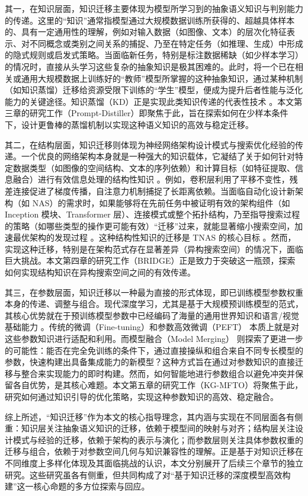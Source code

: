 \documentclass[../main.tex]{subfiles}
\begin{document}
其一，在知识层面，知识迁移主要体现为模型所学习到的抽象语义知识与判别能力的传递。这里的“知识”通常指模型通过大规模数据训练所获得的、超越具体样本的、具有一定通用性的理解，例如对输入数据（如图像、文本）的层次化特征表示、对不同概念或类别之间关系的捕捉、乃至在特定任务（如推理、生成）中形成的隐式规则或启发式策略。当面临新任务，特别是标注数据稀缺（如少样本学习）的情况时，直接从头学习这些复杂的抽象知识是极其困难的。此时，将一个已在相关或通用大规模数据上训练好的“教师”模型所掌握的这种抽象知识，通过某种机制（如知识蒸馏）迁移给资源受限下训练的“学生”模型，便成为提升后者性能与泛化能力的关键途径。知识蒸馏（KD）正是实现此类知识传递的代表性技术 。本文第三章的研究工作（Prompt-Distiller）即聚焦于此，旨在探索如何在少样本条件下，设计更鲁棒的蒸馏机制以实现这种语义知识的高效与稳定迁移。

其二，在结构层面，知识迁移则体现为神经网络架构设计模式与搜索优化经验的传递。一个优良的网络架构本身就是一种强大的知识载体，它凝结了关于如何针对特定数据类型（如图像的空间结构、文本的序列依赖）和计算目标（如特征提取、信息融合）进行有效信息处理的结构性知识 。例如，卷积层利用了平移不变性，残差连接促进了梯度传播，自注意力机制捕捉了长距离依赖。当面临自动化设计新架构（如 NAS）的需求时，如果能够将在先前任务中被证明有效的架构组件（如 Inception 模块、Transformer 层）、连接模式或整个拓扑结构，乃至指导搜索过程的策略（如哪些类型的操作更可能有效）“迁移”过来，就能显著缩小搜索空间，加速最优架构的发现过程 。这种结构性知识的迁移是 TNAS 的核心目标 。然而，实现这种迁移，特别是在架构范式存在显著差异（异构搜索空间）的情况下，面临巨大挑战。本文第四章的研究工作（BRIDGE）正是致力于突破这一瓶颈，探索如何实现结构知识在异构搜索空间之间的有效传递。

其三，在参数层面，知识迁移以一种最为直接的形式体现，即已训练模型参数权重本身的传递、调整与组合。现代深度学习，尤其是基于大规模预训练模型的范式，其核心优势就在于预训练模型参数中已经编码了海量的通用世界知识和语言/视觉基础能力 。传统的微调（Fine-tuning）和参数高效微调（PEFT） 本质上就是对这些参数知识进行适配和利用。而模型融合（Model Merging）  则探索了更进一步的可能性：能否在完全免训练的条件下，通过直接操纵和组合来自不同专长模型的参数，快速构建出具备集成能力的新模型？这种方式旨在通过对参数知识的直接迁移与整合来实现能力的即时构建。然而，如何智能地进行参数组合以避免冲突并保留各自优势，是其核心难题。本文第五章的研究工作（KG-MFTO）将聚焦于此，研究如何通过知识引导的优化策略，实现这种参数知识的高效、稳定融合。

综上所述，“知识迁移”作为本文的核心指导理念，其内涵与实现在不同层面各有侧重：知识层关注抽象语义知识的迁移，依赖于模型间的映射与对齐；结构层关注设计模式与经验的迁移，依赖于架构的表示与演化；而参数层则关注具体参数权重的迁移与组合，依赖于对参数空间几何与知识兼容性的理解。正是基于对知识迁移在不同维度上多样化体现及其面临挑战的认识，本文分别展开了后续三个章节的独立研究。这些研究虽各有侧重，但共同构成了对“基于知识迁移的深度模型高效构建”这一核心命题的多方位探索与回应。
\end{document}
